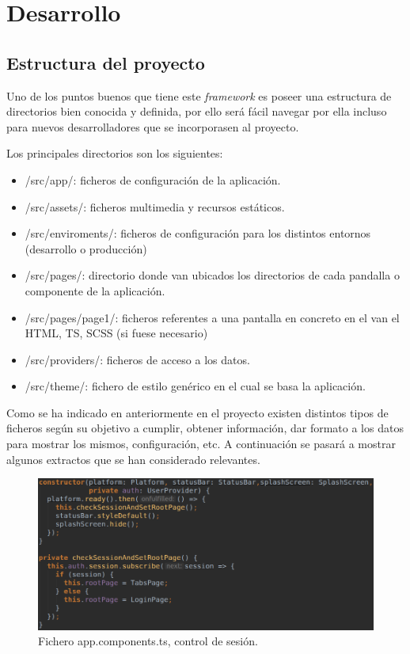 \section{Desarrollo}
\subsection{Estructura del proyecto}

Uno de los puntos buenos que tiene este \textit{framework} es
poseer una estructura de directorios bien conocida y definida,
por ello será fácil navegar por ella incluso para nuevos
desarrolladores que se incorporasen al proyecto.

\medskip
Los principales directorios son los siguientes:

\begin{itemize}
    \item /src/app/: ficheros de configuración de la aplicación.
    \item /src/assets/: ficheros multimedia y recursos estáticos.
    \item /src/enviroments/: ficheros de configuración para los
    distintos entornos (desarrollo o producción)
    \item /src/pages/: directorio donde van ubicados los directorios
    de cada pandalla o componente de la aplicación.
    \item /src/pages/page1/: ficheros referentes a una pantalla en
    concreto en el van el HTML, TS, SCSS (si fuese necesario)
    \item /src/providers/: ficheros de acceso a los datos.
    \item /src/theme/: fichero de estilo genérico en el cual
    se basa la aplicación.
\end{itemize}

\medskip
Como se ha indicado en anteriormente en el proyecto existen distintos
tipos de ficheros según su objetivo a cumplir, obtener información,
dar formato a los datos para mostrar los mismos, configuración, etc.
A continuación se pasará a mostrar algunos extractos que se han
considerado relevantes.

\begin{figure}
    \includegraphics[width=\linewidth]{./images/code/app-components-ts.png}
    \caption{Fichero app.components.ts, control de sesión.}
    \label{app.components.ts}
\end{figure}

